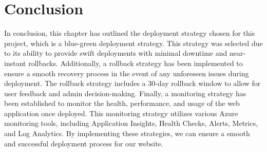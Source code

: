 
\section*{Conclusion}
In conclusion, this chapter has outlined the deployment strategy chosen for this project, which is a blue-green deployment strategy. This strategy was selected due to its ability to provide swift deployments with minimal downtime and near-instant rollbacks. Additionally, a rollback strategy has been implemented to ensure a smooth recovery process in the event of any unforeseen issues during deployment. The rollback strategy includes a 30-day rollback window to allow for user feedback and admin decision-making. Finally, a monitoring strategy has been established to monitor the health, performance, and usage of the web application once deployed. This monitoring strategy utilizes various Azure monitoring tools, including Application Insights, Health Checks, Alerts, Metrics, and Log Analytics. By implementing these strategies, we can ensure a smooth and successful deployment process for our website.
